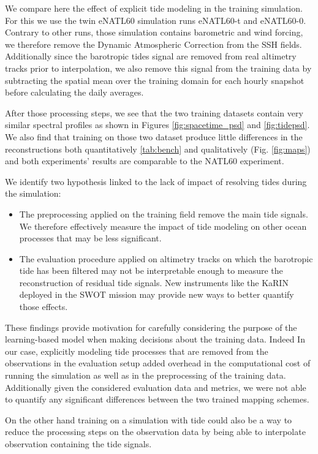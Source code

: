 \documentclass[draft]{agujournal2019}
\begin{document}
We compare here the effect of explicit tide modeling in the training simulation. For this we use the twin eNATL60 simulation runs eNATL60-t and eNATL60-0.  Contrary to other runs, those simulation contains barometric and wind forcing, we therefore remove the Dynamic Atmospheric Correction from the SSH fields. Additionally since the barotropic tides signal are removed from real altimetry tracks prior to interpolation, we also remove this signal from the training data by subtracting the spatial mean over the training domain for each hourly snapshot before calculating the daily averages.  

After those processing steps, we see that the two training datasets contain very similar spectral profiles as shown in Figures \ref{fig:spacetime_psd} and \ref{fig:tidepsd}. 
We also find that training on those two dataset produce little differences in the reconstructions both quantitatively \ref{tab:bench} and qualitatively (Fig. \ref{fig:maps}) and both experiments' results are comparable to the NATL60 experiment.
 
We identify two hypothesis linked to the lack of impact of resolving tides during the simulation:
\begin{itemize}
    \item The preprocessing applied on the training field remove the main tide signals. We therefore effectively measure the impact of tide modeling on other ocean processes that may be less significant.
    \item The evaluation procedure applied on altimetry tracks on which the barotropic tide has been filtered may not be interpretable enough to measure the reconstruction of residual tide signals. New instruments like the KaRIN deployed in the SWOT mission may provide new ways to better quantify those effects.   
\end{itemize}

These findings provide motivation for carefully considering the purpose of the learning-based model when making decisions about the training data. Indeed In our case, explicitly modeling tide processes that are removed from the observations in the evaluation setup added overhead in the computational cost of running the simulation as well as in the preprocessing of the training data. Additionally given the considered evaluation data and metrics, we were not able to quantify any significant differences between the two trained mapping schemes.

On the other hand training on a simulation with tide could also be a way to reduce the processing steps on the observation data by being able to interpolate observation containing the tide signals.
\end{document}
